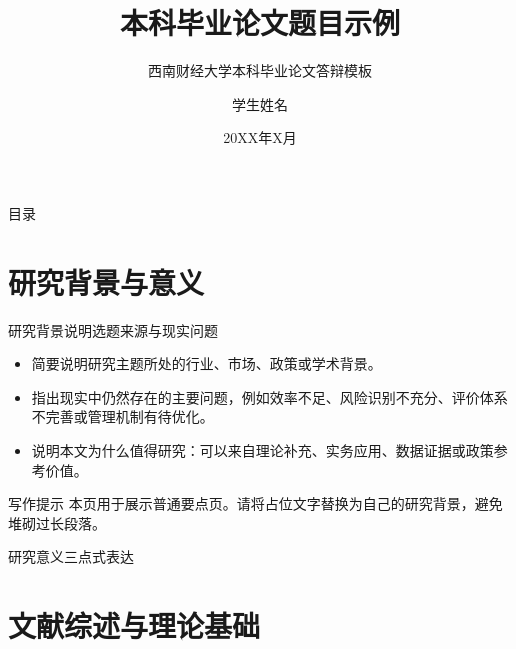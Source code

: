 \documentclass[aspectratio=169,11pt]{beamer}
\title{本科毕业论文题目示例}
\subtitle{西南财经大学本科毕业论文答辩模板}
\author{学生姓名}
\date{20XX年X月}
\begin{document}
\begin{frame}
  \titlepage
\end{frame}

\begin{frame}{目录}
  \tableofcontents
\end{frame}

\section{研究背景与意义}

\begin{frame}{研究背景}{说明选题来源与现实问题}
  \begin{itemize}
    \item 简要说明研究主题所处的行业、市场、政策或学术背景。
    \item 指出现实中仍然存在的主要问题，例如效率不足、风险识别不充分、评价体系不完善或管理机制有待优化。
    \item 说明本文为什么值得研究：可以来自理论补充、实务应用、数据证据或政策参考价值。
  \end{itemize}
  \begin{alertblock}{写作提示}
    本页用于展示普通要点页。请将占位文字替换为自己的研究背景，避免堆砌过长段落。
  \end{alertblock}
\end{frame}

\begin{frame}{研究意义}{三点式表达}
  \begin{swufekeypoints}
  \end{swufekeypoints}
\end{frame}

\section{文献综述与理论基础}
\end{document}

